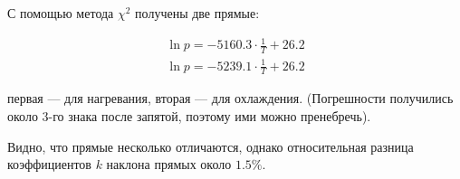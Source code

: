 \documentclass[a4paper,12pt]{report}
\begin{document}
\begin{figure}[H]
\end{figure}

\begin{multicols}{2}
    С помощью метода $\chi^2$ получены две прямые:

    \begin{gather*}
        \ln{p}=-5160.3\cdot \frac{1}{T} + 26.2 \\
        \ln{p}=-5239.1\cdot \frac{1}{T} + 26.2
    \end{gather*}

    первая --- для нагревания, вторая --- для охлаждения. (Погрешности получились около 3-го знака после запятой, поэтому ими можно пренебречь).

    Видно, что прямые несколько отличаются, однако относительная разница коэффициентов $k$ наклона прямых около $1.5\%$.
\end{multicols}
\end{document}
